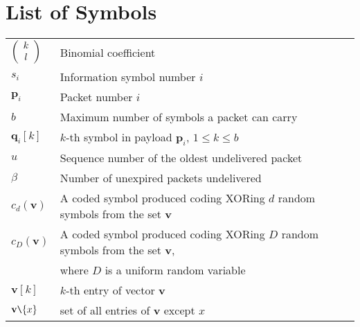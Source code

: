 \chapter*{List of Symbols}

\begin{longtable}{ll}

$\left( {\begin{array}{*{20}c}
                   k\\ l\\ \end{array}} \right) $  & Binomial coefficient\\

$s_i$ & Information symbol number $i$\\
$\mathbf{p}_i$ & Packet number $i$\\
$b$ & Maximum number of symbols a packet can carry\\
$\mathbf{q}_i[k]$ & $k$-th symbol in payload  $\mathbf{p}_i$, $1$$\leq$$k$$\leq$$b$\\
$u$ & Sequence number of the oldest undelivered packet\\
$\beta$ & Number of unexpired packets undelivered\\
$c_d(\mathbf{v})$ & A coded symbol produced coding XORing $d$ random symbols from the set $\mathbf{v}$\\
$c_D(\mathbf{v})$ & A coded symbol produced coding XORing $D$ random symbols from the set $\mathbf{v}$,\\
 & where $D$ is a uniform random variable\\
$\mathbf{v}[k]$ & $k$-th entry of vector $\mathbf{v}$\\
$\mathbf{v} \texttt{\char`\\} \{x\}$ & set of all entries of $\mathbf{v}$ except $x$


\end{longtable}


























